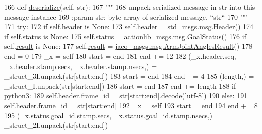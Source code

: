 \begin{DoxyCode}
166   \textcolor{keyword}{def }\hyperlink{classjaco__msgs_1_1msg_1_1__ArmJointAnglesActionResult_1_1ArmJointAnglesActionResult_a1f4a105e255846a8e5431ee4680985d8}{deserialize}(self, str):
167     \textcolor{stringliteral}{"""}
168 \textcolor{stringliteral}{    unpack serialized message in str into this message instance}
169 \textcolor{stringliteral}{    :param str: byte array of serialized message, ``str``}
170 \textcolor{stringliteral}{    """}
171     \textcolor{keywordflow}{try}:
172       \textcolor{keywordflow}{if} self.\hyperlink{classjaco__msgs_1_1msg_1_1__ArmJointAnglesActionResult_1_1ArmJointAnglesActionResult_a42432041a06f195ca4c7566f6157062e}{header} \textcolor{keywordflow}{is} \textcolor{keywordtype}{None}:
173         self.\hyperlink{classjaco__msgs_1_1msg_1_1__ArmJointAnglesActionResult_1_1ArmJointAnglesActionResult_a42432041a06f195ca4c7566f6157062e}{header} = std\_msgs.msg.Header()
174       \textcolor{keywordflow}{if} self.\hyperlink{classjaco__msgs_1_1msg_1_1__ArmJointAnglesActionResult_1_1ArmJointAnglesActionResult_abc96fae35bee25ca7d43d60fb9a09cc2}{status} \textcolor{keywordflow}{is} \textcolor{keywordtype}{None}:
175         self.\hyperlink{classjaco__msgs_1_1msg_1_1__ArmJointAnglesActionResult_1_1ArmJointAnglesActionResult_abc96fae35bee25ca7d43d60fb9a09cc2}{status} = actionlib\_msgs.msg.GoalStatus()
176       \textcolor{keywordflow}{if} self.\hyperlink{classjaco__msgs_1_1msg_1_1__ArmJointAnglesActionResult_1_1ArmJointAnglesActionResult_a834e2d539b66918188653979cece4d81}{result} \textcolor{keywordflow}{is} \textcolor{keywordtype}{None}:
177         self.\hyperlink{classjaco__msgs_1_1msg_1_1__ArmJointAnglesActionResult_1_1ArmJointAnglesActionResult_a834e2d539b66918188653979cece4d81}{result} = \hyperlink{classjaco__msgs_1_1msg_1_1__ArmJointAnglesResult_1_1ArmJointAnglesResult}{jaco\_msgs.msg.ArmJointAnglesResult}()
178       end = 0
179       \_x = self
180       start = end
181       end += 12
182       (\_x.header.seq, \_x.header.stamp.secs, \_x.header.stamp.nsecs,) = \_struct\_3I.unpack(str[start:end])
183       start = end
184       end += 4
185       (length,) = \_struct\_I.unpack(str[start:end])
186       start = end
187       end += length
188       \textcolor{keywordflow}{if} python3:
189         self.header.frame\_id = str[start:end].decode(\textcolor{stringliteral}{'utf-8'})
190       \textcolor{keywordflow}{else}:
191         self.header.frame\_id = str[start:end]
192       \_x = self
193       start = end
194       end += 8
195       (\_x.status.goal\_id.stamp.secs, \_x.status.goal\_id.stamp.nsecs,) = \_struct\_2I.unpack(str[start:end])

\end{DoxyCode}
